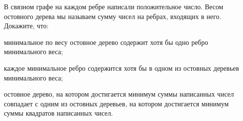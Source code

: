 В связном графе на каждом ребре написали положительное число. Весом остовного дерева мы называем сумму
чисел на ребрах, входящих в него. Докажите, что:
\begin{enumcyr}
    \item минимальное по весу остовное дерево содержит хотя бы одно ребро минимального веса;
    \item каждое минимальное ребро содержится хотя бы в одном из остовных деревьев минимального веса;
    \item остовное дерево, на котором достигается минимум суммы написанных чисел совпадает с одним из
        остовных деревьев, на котором достигается минимум суммы квадратов написанных чисел.
\end{enumcyr}